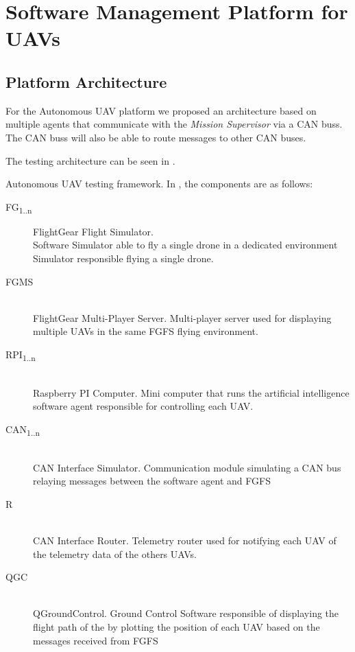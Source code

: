\chapter{Software Management Platform for UAVs}
\label{chapter:uav-management-framework}

\section{Platform Architecture}
\label{sec:architecture}
For the Autonomous UAV platform we proposed an architecture based on multiple
agents that communicate with the \textit{Mission Supervisor} via a CAN buss.
The CAN buss will also be able to route messages to other CAN buses. 

The testing architecture can be seen in  .

{Autonomous UAV testing framework.}
\newpage
In , the components are as
follows:
\begin{description}
\item [FG\textsubscript{1..n}] FlightGear Flight Simulator. \hfill \\
Software Simulator able to fly a single drone in a dedicated environment
Simulator responsible
flying a single drone.
\item [FGMS] \hfill \\ FlightGear Multi-Player Server. 
Multi-player server used for displaying multiple UAVs in the same FGFS flying environment.
\item [RPI\textsubscript{1..n}] \hfill \\Raspberry PI Computer. 
Mini computer that runs the artificial intelligence software agent responsible for
controlling each UAV.
\item [CAN\textsubscript{1..n}] \hfill \\ CAN Interface Simulator.
Communication module simulating a CAN bus relaying messages between the software agent and FGFS
\item [R] \hfill \\ CAN Interface Router. Telemetry router used for notifying each
UAV of the telemetry data of the others UAVs.
\item [QGC] \hfill \\ QGroundControl. Ground Control Software responsible of
displaying the flight path of the by plotting the position of each 
UAV based on the messages received from FGFS
\end{description}

